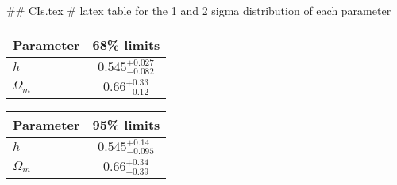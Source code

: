 ## CIs.tex
# latex table for the 1 and 2 sigma distribution of each parameter

\begin{tabular} { l  c}
 Parameter &  68\% limits\\
\hline
{\boldmath$h              $} & $0.545^{+0.027}_{-0.082}   $\\
{\boldmath$\Omega_m       $} & $0.66^{+0.33}_{-0.12}      $\\
\hline
\end{tabular}

\begin{tabular} { l  c}
 Parameter &  95\% limits\\
\hline
{\boldmath$h              $} & $0.545^{+0.14}_{-0.095}    $\\
{\boldmath$\Omega_m       $} & $0.66^{+0.34}_{-0.39}      $\\
\hline
\end{tabular}
